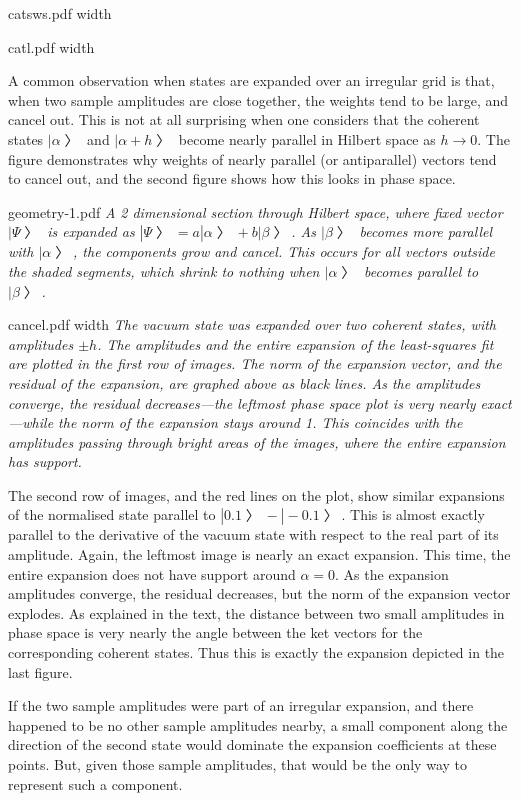 \topinsert\XeTeXpicfile catsws.pdf width \hsize\endinsert

\topinsert\XeTeXpicfile catl.pdf width \hsize\endinsert

A common observation when states are expanded over an irregular grid is that, when two sample amplitudes are close together, the weights tend to be large, and cancel out.  This is not at all surprising when one considers that the coherent states $|α〉$ and $|α+h〉$ become nearly parallel in Hilbert space as $h→0$.  The figure demonstrates why weights of nearly parallel (or antiparallel) vectors tend to cancel out, and the second figure shows how this looks in phase space.

\topinsert \XeTeXpicfile geometry-1.pdf
\it A 2 dimensional section through Hilbert space, where fixed vector $|Ψ〉$ is expanded as $|Ψ〉=a|α〉+b|β〉$.  As $|β〉$ becomes more parallel with $|α〉$, the components grow and cancel.  This occurs for all vectors outside the shaded segments, which shrink to nothing when $|α〉$ becomes parallel to $|β〉$.
\endinsert

\topinsert \XeTeXpicfile cancel.pdf width \hsize
\it The vacuum state was expanded over two coherent states, with amplitudes $±h$.  The amplitudes and the entire expansion of the least-squares fit are plotted in the first row of images.  The norm of the expansion vector, and the residual of the expansion, are graphed above as black lines.  As the amplitudes converge, the residual decreases—the leftmost phase space plot is very nearly exact—while the norm of the expansion stays around 1.  This coincides with the amplitudes passing through bright areas of the images, where the entire expansion has support.

The second row of images, and the red lines on the plot, show similar expansions of the normalised state parallel to $|0.1〉-|-0.1〉$.  This is almost exactly parallel to the derivative of the vacuum state with respect to the real part of its amplitude.  Again, the leftmost image is nearly an exact expansion.  This time, the entire expansion does not have support around $α=0$.  As the expansion amplitudes converge, the residual decreases, but the norm of the expansion vector explodes.  As explained in the text, the distance between two small amplitudes in phase space is very nearly the angle between the ket vectors for the corresponding coherent states.  Thus this is exactly the expansion depicted in the last figure.

If the two sample amplitudes were part of an irregular expansion, and there happened to be no other sample amplitudes nearby, a small component along the direction of the second state would dominate the expansion coefficients at these points.  But, given those sample amplitudes, that would be the only way to represent such a component.
\endinsert

